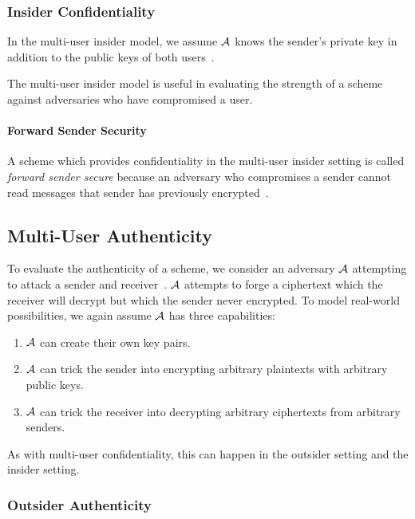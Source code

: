 \subsubsection{Insider Confidentiality}\label{subsubsec:sec-conf-insider}

In the multi-user insider model, we assume $\mathcal{A}$ knows the sender's private key in addition to the public keys of
both users~\cite[p. 45--46]{baek2010}.

The multi-user insider model is useful in evaluating the strength of a scheme against adversaries who have compromised
a user.

\paragraph{Forward Sender Security}

A scheme which provides confidentiality in the multi-user insider setting is called \emph{forward sender secure} because
an adversary who compromises a sender cannot read messages that sender has previously encrypted~\cite{canetti2003}.

\subsection{Multi-User Authenticity}\label{subsec:sec-auth}

To evaluate the authenticity of a scheme, we consider an adversary $\mathcal{A}$ attempting to attack a sender and
receiver~\cite[p. 47]{baek2010}.
$\mathcal{A}$ attempts to forge a ciphertext which the receiver will decrypt but which the sender never encrypted.
To model real-world possibilities, we again assume $\mathcal{A}$ has three capabilities:

\begin{enumerate}
    \item $\mathcal{A}$ can create their own key pairs.
    \item $\mathcal{A}$ can trick the sender into encrypting arbitrary plaintexts with arbitrary public keys.
    \item $\mathcal{A}$ can trick the receiver into decrypting arbitrary ciphertexts from arbitrary senders.
\end{enumerate}

As with multi-user confidentiality, this can happen in the outsider setting and the insider setting.

\subsubsection{Outsider Authenticity}\label{subsubsec:sec-auth-outsider}


